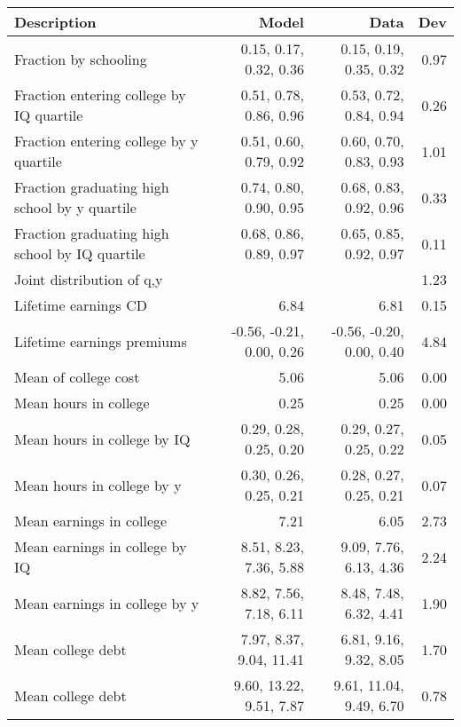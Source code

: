 \begin{tabular}{lrrr}
\hline
Description & Model  & Data  & Dev  \\ 
\hline
Fraction by schooling & 0.15, 0.17, 0.32, 0.36  & 0.15, 0.19, 0.35, 0.32  & 0.97  \\ 
Fraction entering college by IQ quartile & 0.51, 0.78, 0.86, 0.96  & 0.53, 0.72, 0.84, 0.94  & 0.26  \\ 
Fraction entering college by y quartile & 0.51, 0.60, 0.79, 0.92  & 0.60, 0.70, 0.83, 0.93  & 1.01  \\ 
Fraction graduating high school by y quartile & 0.74, 0.80, 0.90, 0.95  & 0.68, 0.83, 0.92, 0.96  & 0.33  \\ 
Fraction graduating high school by IQ quartile & 0.68, 0.86, 0.89, 0.97  & 0.65, 0.85, 0.92, 0.97  & 0.11  \\ 
Joint distribution of q,y &   &   & 1.23  \\ 
Lifetime earnings CD & 6.84  & 6.81  & 0.15  \\ 
Lifetime earnings premiums & -0.56, -0.21, 0.00, 0.26  & -0.56, -0.20, 0.00, 0.40  & 4.84  \\ 
Mean of college cost & 5.06  & 5.06  & 0.00  \\ 
Mean hours in college & 0.25  & 0.25  & 0.00  \\ 
Mean hours in college by IQ & 0.29, 0.28, 0.25, 0.20  & 0.29, 0.27, 0.25, 0.22  & 0.05  \\ 
Mean hours in college by y & 0.30, 0.26, 0.25, 0.21  & 0.28, 0.27, 0.25, 0.21  & 0.07  \\ 
Mean earnings in college & 7.21  & 6.05  & 2.73  \\ 
Mean earnings in college by IQ & 8.51, 8.23, 7.36, 5.88  & 9.09, 7.76, 6.13, 4.36  & 2.24  \\ 
Mean earnings in college by y & 8.82, 7.56, 7.18, 6.11  & 8.48, 7.48, 6.32, 4.41  & 1.90  \\ 
Mean college debt & 7.97, 8.37, 9.04, 11.41  & 6.81, 9.16, 9.32, 8.05  & 1.70  \\ 
Mean college debt & 9.60, 13.22, 9.51, 7.87  & 9.61, 11.04, 9.49, 6.70  & 0.78  \\ 
\hline
\end{tabular}%
